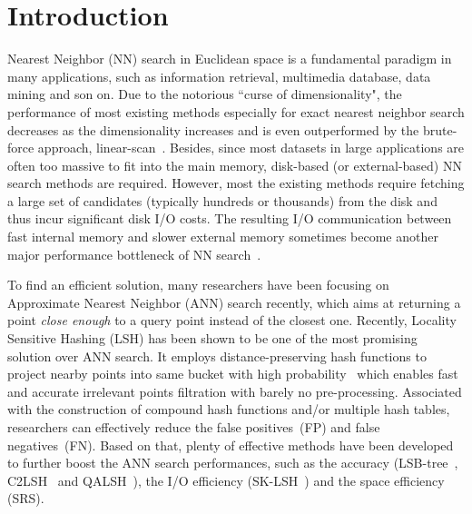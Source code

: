 \documentclass[twocolumn]{svjour3}          %
\begin{document}
\section{Introduction}\label{sec:introduction}
Nearest Neighbor (NN) search in Euclidean space is a fundamental paradigm in many applications, such as information retrieval, multimedia database, data mining and son on. 
Due to the notorious ``curse of dimensionality", the performance of most existing methods 
especially for exact nearest neighbor search decreases as the dimensionality increases and is even outperformed by the brute-force approach, linear-scan~\cite{Bohm2000,Weber1998}. 
Besides, since most datasets in large applications are often too massive to fit into the main memory, disk-based (or external-based) NN search methods are required. However, most the existing methods require fetching a large set of candidates (typically hundreds or thousands) from the disk and thus incur significant disk I/O costs. The resulting I/O communication between fast internal memory and slower external memory sometimes become another major performance bottleneck of NN search~\cite{Vitter2008EM}.


To find an efficient solution, many researchers have been focusing on Approximate Nearest Neighbor (ANN) search recently, which aims at returning a point \emph{close enough} to a query point instead of the closest one. 
Recently, Locality Sensitive Hashing (LSH) has been shown to be one of the most promising solution over ANN search. It employs 
distance-preserving hash functions to project nearby points into same bucket with high probability~\cite{Gionis1999,Indyk1998LSH} which enables fast and accurate irrelevant points filtration with barely no pre-processing. Associated with the construction of compound hash functions and/or multiple hash tables, researchers can effectively reduce the false positives~(FP) and false negatives~(FN). Based on that, plenty of effective methods have been developed to further boost the ANN search performances, such as the accuracy (LSB-tree~\cite{Tao2009LSB}, C2LSH~\cite{Gan2012C2LSH} and QALSH~\cite{Huang2015QALSH}), the I/O efficiency (SK-LSH~\cite{Liu2014SKLSH}) and the space efficiency (SRS\cite{Sun2014SRS}).
\end{document}

